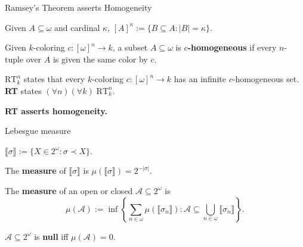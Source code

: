 \begin{frame}{Ramsey's Theorem asserts Homogeneity}
  \begin{notation*}
    Given $A\subseteq\omega$ and cardinal $\kappa$,
    $[A]^\kappa :=\{B\subseteq A:|B|=\kappa\}$.
  \end{notation*}

  \begin{define*}[$c$-homogeneous]
    Given $k$-coloring $c:[\omega]^n\rightarrow k$, a subset
    $A\subseteq\omega$ is \textbf{$c$-homogeneous} if every $n$-tuple over
    $A$ is given the same color by $c$.
  \end{define*}

  \begin{thm*}[Ramsey's]
    \textbf{$\text{RT}_k^n$} states that every $k$-coloring
    $c:[\omega]^n\rightarrow k$ has an infinite $c$-homogeneous set.
    \textbf{RT} states $(\forall n)(\forall k)\; \text{RT}_k^n$.
  \end{thm*}

  \vspace{0.5em}
  \textbf{RT asserts homogeneity.}
\end{frame}

\begin{frame}{Lebesgue measure}
  \begin{notation*}
    $\llbracket\sigma\rrbracket :=\{X\in2^\omega: \sigma\prec X\}$.
  \end{notation*}

  \begin{define*}
    The \textbf{measure} of $\llbracket\sigma\rrbracket$ is
    $\mu(\llbracket\sigma\rrbracket) =2^{-|\sigma|}$.
  \end{define*}

  \begin{define*}
    The \textbf{measure} of an open or closed
    $\mathcal{A}\subseteq2^\omega$ is
    \[\mu(\mathcal{A}):= \inf\left\{\sum_{n\in\omega}
    \mu(\llbracket\sigma_n\rrbracket): \mathcal{A}\subseteq
    \bigcup_{n\in\omega} \llbracket\sigma_n\rrbracket\right\}.\]
  \end{define*}

  \begin{define*}
    $\mathcal{A}\subseteq2^\omega$ is \textbf{null} iff
    $\mu(\mathcal{A})=0$.
  \end{define*}
\end{frame}

